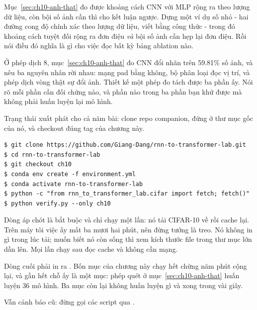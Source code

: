 \begin{bt}
  \item Mục~\ref{sec:ch10-anh-that} đo được khoảng cách CNN với MLP rộng ra theo
    lượng dữ liệu, còn bội số ảnh cần thì cho kết luận ngược. Dựng một ví dụ số
    nhỏ - hai đường cong độ chính xác theo lượng dữ liệu, viết bằng công thức -
    trong đó khoảng cách tuyệt đối rộng ra đơn điệu \emph{và} bội số ảnh cần
    hẹp lại đơn điệu. Rồi nói điều đó nghĩa là gì cho việc đọc bất kỳ bảng
    ablation nào.

  \item Ở phép dịch 8, mục~\ref{sec:ch10-anh-that} đo CNN đổi nhãn trên 59.81\%
    số ảnh, và nêu ba nguyên nhân rời nhau: mạng pad bằng không, bộ phân loại
    đọc vị trí, và phép dịch vòng thật sự đổi ảnh. Thiết kế một phép đo tách
    được ba phần ấy. Nói rõ mỗi phần cần đối chứng nào, và phần nào trong ba
    phần bạn khử được mà không phải huấn luyện lại mô hình.
\end{bt}

\tierapply

Trạng thái xuất phát cho cả năm bài: clone repo companion, đứng ở thư mục gốc
của nó, và checkout đúng tag của chương này.

\begin{verbatim}
$ git clone https://github.com/Giang-Dang/rnn-to-transformer-lab.git
$ cd rnn-to-transformer-lab
$ git checkout ch10
$ conda env create -f environment.yml
$ conda activate rnn-to-transformer-lab
$ python -c "from rnn_to_transformer_lab.cifar import fetch; fetch()"
$ python verify.py --only ch10
\end{verbatim}

Dòng áp chót là bắt buộc và chỉ chạy một lần: nó tải CIFAR-10 về rồi cache
lại. Trên máy tôi việc ấy mất ba mươi hai phút, nên đừng tưởng là treo. Nó
không in gì trong lúc tải; muốn biết nó còn sống thì xem kích thước file trong
thư mục  lớn dần lên. Mọi lần chạy sau đọc cache và không cần mạng.

Dòng cuối phải in ra . Bốn mục của chương này chạy hết chừng
năm phút cộng lại, và gần hết chỗ ấy là một mục: phép quét ở
mục~\ref{sec:ch10-anh-that} huấn luyện 36 mô hình. Ba mục còn lại không huấn
luyện gì và xong trong vài giây.

Vẫn cảnh báo cũ: đừng gọi các script qua .

